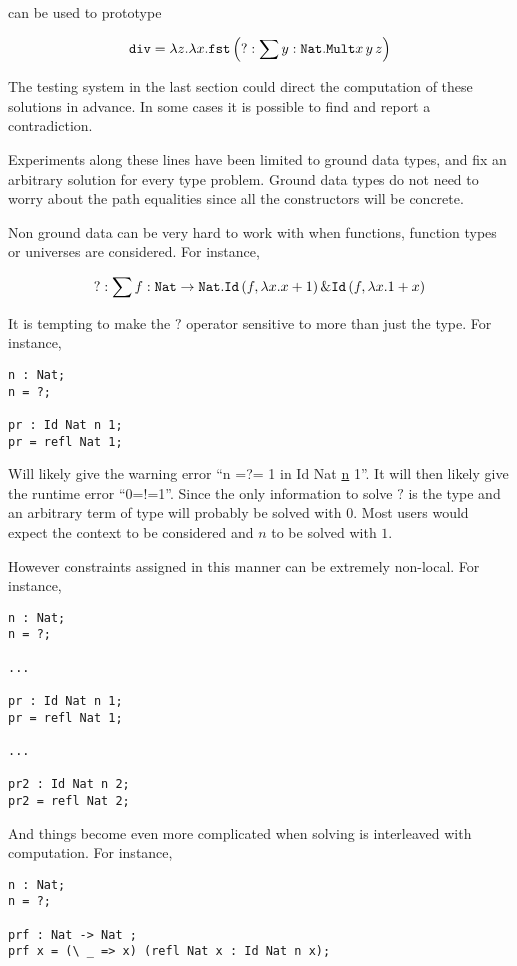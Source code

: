 can be used to prototype

\[
\mathtt{div}=\lambda z.\lambda x.\mathtt{fst}\left(?:\sum y:\mathtt{Nat}{}.\mathtt{Mult}x\,y\,z\right)
\]

The testing system in the last section could direct the computation of these solutions in advance.
In some cases it is possible to find and report a contradiction. 

Experiments along these lines have been limited to ground data types, and fix an arbitrary solution for every type problem.
Ground data types do not need to worry about the path equalities since all the constructors will be concrete.

Non ground data can be very hard to work with when functions, function types or universes are considered.
For instance,

\[
?:\sum f:\mathtt{Nat}{}\rightarrow\mathtt{Nat}{}.\mathtt{Id}\left(f,\lambda x.x+1\right)\&\mathtt{Id}\left(f,\lambda x.1+x\right)
\]

It is tempting to make the $?$ operator sensitive to more than just the type.
For instance,

\begin{lstlisting}
n : Nat;
n = ?;

pr : Id Nat n 1;
pr = refl Nat 1;
\end{lstlisting}

Will likely give the warning error ``n =?= 1 in Id Nat \uline{n} 1''.
It will then likely give the runtime error ``0=!=1''.
Since the only information to solve $\mathtt{?}$ is the type \Nat{} and an arbitrary term of type \Nat{} will probably be solved with 0.
Most users would expect the context to be considered and $n$ to be solved with $1$.

However constraints assigned in this manner can be extremely non-local.
For instance,

\begin{lstlisting}
n : Nat;
n = ?;

...

pr : Id Nat n 1;
pr = refl Nat 1;

...

pr2 : Id Nat n 2;
pr2 = refl Nat 2;
\end{lstlisting}

And things become even more complicated when solving is interleaved with computation.
For instance,

\begin{lstlisting}
n : Nat;
n = ?;

prf : Nat -> Nat ;
prf x = (\ _ => x) (refl Nat x : Id Nat n x);
\end{lstlisting}


